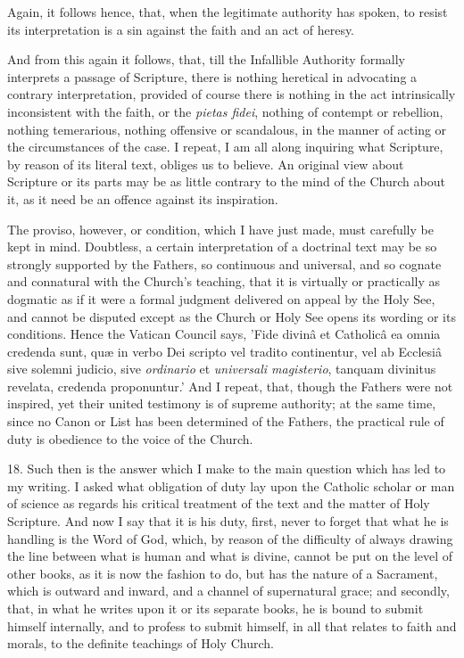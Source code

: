 Again, it follows hence, that, when the
legitimate authority has spoken, to resist its interpretation is a sin
against the faith and an act of heresy.

And from this again it follows, that, till the
Infallible Authority formally interprets a passage of Scripture, there
is nothing heretical in advocating a contrary interpretation, provided
of course there is nothing in the act intrinsically inconsistent with
the faith, or the \emph{pietas fidei}, nothing of contempt or
rebellion, nothing temerarious, nothing offensive or scandalous, in
the manner of acting or the circumstances of the case. I repeat, I am
all along inquiring what Scripture, by reason of its literal text,
obliges us to believe. An original view about Scripture or its parts
may be as little contrary to the mind of the Church about it, as it
need be an offence against its inspiration.

The proviso, however, or condition, which I have
just made, must carefully be kept in mind. Doubtless, a certain
interpretation of a doctrinal text may be so strongly supported by the
Fathers, so continuous and universal, and so cognate and connatural
with the Church's teaching, that it is virtually or practically as
dogmatic as if it were a formal judgment delivered on appeal by the
Holy See, and cannot be disputed except as the Church or Holy See
opens its wording or its conditions. Hence the Vatican Council says,
'Fide divinâ et Catholicâ ea omnia credenda sunt, quæ in verbo Dei
scripto vel tradito continentur, vel ab Ecclesiâ sive solemni judicio,
sive \emph{ordinario} et \emph{universali magisterio}, tanquam
divinitus revelata, credenda proponuntur.' And I repeat, that, though
the Fathers were not inspired, yet their united testimony is of
supreme authority; at the same time, since no Canon or List has been
determined of the Fathers, the practical rule of duty is
obedience to the voice of the Church.

18. Such then is the answer which I make to the
main question which has led to my writing. I asked what obligation of
duty lay upon the Catholic scholar or man of science as regards his
critical treatment of the text and the matter of Holy Scripture. And
now I say that it is his duty, first, never to forget that what he is
handling is the Word of God, which, by reason of the difficulty of
always drawing the line between what is human and what is divine,
cannot be put on the level of other books, as it is now the fashion to
do, but has the nature of a Sacrament, which is outward and inward,
and a channel of supernatural grace; and secondly, that, in what he
writes upon it or its separate books, he is bound to submit himself
internally, and to profess to submit himself, in all that relates to
faith and morals, to the definite teachings of Holy Church.

